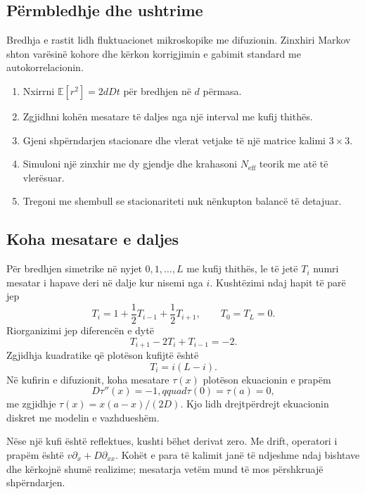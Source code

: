 \documentclass[11pt,oneside,openany]{book}
\newcommand{\E}{\mathbb{E}}
\begin{document}
\subsection{Përmbledhje dhe ushtrime}
Bredhja e rastit lidh fluktuacionet mikroskopike me difuzionin. Zinxhiri Markov shton varësinë kohore dhe kërkon korrigjimin e gabimit standard me autokorrelacionin.
\begin{enumerate}
\item Nxirrni $\E[r^2]=2dDt$ për bredhjen në $d$ përmasa.
\item Zgjidhni kohën mesatare të daljes nga një interval me kufij thithës.
\item Gjeni shpërndarjen stacionare dhe vlerat vetjake të një matrice kalimi $3\times3$.
\item Simuloni një zinxhir me dy gjendje dhe krahasoni $N_{\mathrm{eff}}$ teorik me atë të vlerësuar.
\item Tregoni me shembull se stacionariteti nuk nënkupton balancë të detajuar.
\end{enumerate}



\subsection{Koha mesatare e daljes}
Për bredhjen simetrike në nyjet $0,1,\ldots,L$ me kufij thithës, le të jetë $T_i$ numri mesatar i hapave deri në dalje kur nisemi nga $i$. Kushtëzimi ndaj hapit të parë jep
\begin{equation}
 T_i=1+\frac12T_{i-1}+\frac12T_{i+1},
 \qquad T_0=T_L=0.
\end{equation}
Riorganizimi jep diferencën e dytë
\begin{equation}
 T_{i+1}-2T_i+T_{i-1}=-2.
\end{equation}
Zgjidhja kuadratike që plotëson kufijtë është
\begin{equation}
 T_i=i(L-i).
\end{equation}
Në kufirin e difuzionit, koha mesatare $\tau(x)$ plotëson ekuacionin e prapëm
\begin{equation}
 D\tau''(x)=-1,qquad \tau(0)=\tau(a)=0,
\end{equation}
me zgjidhje $\tau(x)=x(a-x)/(2D)$. Kjo lidh drejtpërdrejt ekuacionin diskret me modelin e vazhdueshëm.

Nëse një kufi është reflektues, kushti bëhet derivat zero. Me drift, operatori i prapëm është $v\partial_x+D\partial_{xx}$. Kohët e para të kalimit janë të ndjeshme ndaj bishtave dhe kërkojnë shumë realizime; mesatarja vetëm mund të mos përshkruajë shpërndarjen.
\end{document}
